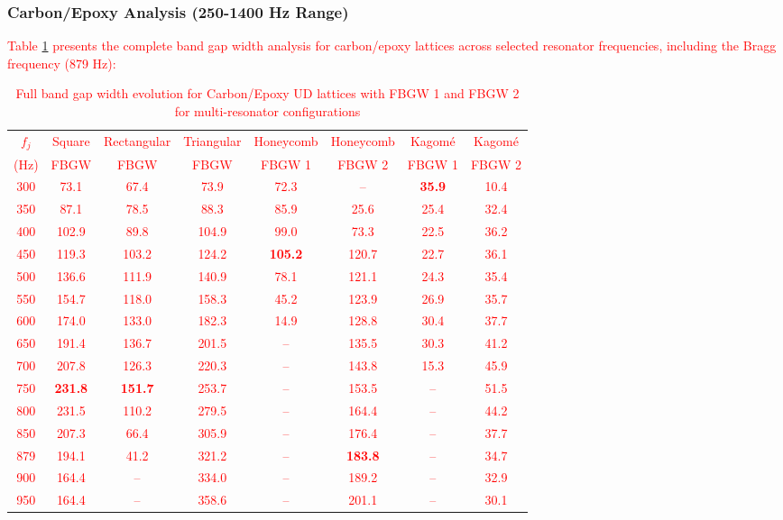 \documentclass[review,numbers,sort&compress]{elsarticle}
\begin{document}
{\subsubsection{Carbon/Epoxy Analysis (250-1400 Hz Range)}

\textcolor{red}{Table \ref{tab:carbon_results} presents the complete band gap width analysis for carbon/epoxy lattices across selected resonator frequencies, including the Bragg frequency (879 Hz):}

\newpage
\textcolor{red}{\begin{table}[!htb]
\centering
\caption{Full band gap width evolution for Carbon/Epoxy UD lattices with FBGW 1 and FBGW 2 for multi-resonator configurations\protect\footnotemark[1]}
\label{tab:carbon_results}
\small
\begin{tabular}{cccccccc}
\hline
$f_j$ & Square & Rectangular & Triangular & Honeycomb & Honeycomb & Kagom\'{e} & Kagom\'{e} \\
(Hz) & FBGW & FBGW & FBGW & FBGW 1 & FBGW 2 & FBGW 1 & FBGW 2 \\
\hline
300 & 73.1 & 67.4 & 73.9 & 72.3 & -- & \textbf{35.9} & 10.4 \\
350 & 87.1 & 78.5 & 88.3 & 85.9 & 25.6 & 25.4 & 32.4 \\
400 & 102.9 & 89.8 & 104.9 & 99.0 & 73.3 & 22.5 & 36.2 \\
450 & 119.3 & 103.2 & 124.2 & \textbf{105.2} & 120.7 & 22.7 & 36.1 \\
500 & 136.6 & 111.9 & 140.9 & 78.1 & 121.1 & 24.3 & 35.4 \\
550 & 154.7 & 118.0 & 158.3 & 45.2 & 123.9 & 26.9 & 35.7 \\
600 & 174.0 & 133.0 & 182.3 & 14.9 & 128.8 & 30.4 & 37.7 \\
650 & 191.4 & 136.7 & 201.5 & -- & 135.5 & 30.3 & 41.2 \\
700 & 207.8 & 126.3 & 220.3 & -- & 143.8 & 15.3 & 45.9 \\
750 & \textbf{231.8} & \textbf{151.7} & 253.7 & -- & 153.5 & -- & 51.5 \\
800 & 231.5 & 110.2 & 279.5 & -- & 164.4 & -- & 44.2 \\
850 & 207.3 & 66.4 & 305.9 & -- & 176.4 & -- & 37.7 \\
879\protect\footnotemark[2] & 194.1 & 41.2 & 321.2 & -- & \textbf{183.8} & -- & 34.7 \\
900 & 164.4 & -- & 334.0 & -- & 189.2 & -- & 32.9 \\
950 & 164.4 & -- & 358.6 & -- & 201.1 & -- & 30.1 \\

\end{tabular}
\end{table}}}
\end{document}
